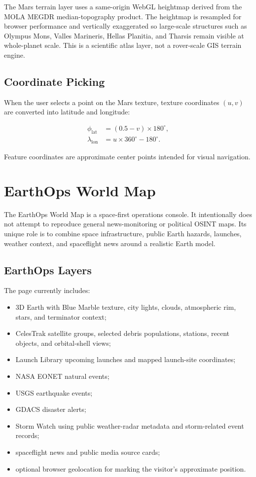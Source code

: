 \documentclass[11pt,a4paper]{article}
\begin{document}
The Mars terrain layer uses a same-origin WebGL heightmap derived from the MOLA MEGDR median-topography product. The heightmap is resampled for browser performance and vertically exaggerated so large-scale structures such as Olympus Mons, Valles Marineris, Hellas Planitia, and Tharsis remain visible at whole-planet scale. This is a scientific atlas layer, not a rover-scale GIS terrain engine.

\subsection{Coordinate Picking}

When the user selects a point on the Mars texture, texture coordinates $(u,v)$ are converted into latitude and longitude:

\begin{align}
\phi_{\mathrm{lat}} &= (0.5-v)\times 180^\circ,\\
\lambda_{\mathrm{lon}} &= u\times 360^\circ - 180^\circ.
\end{align}

Feature coordinates are approximate center points intended for visual navigation.

\section{EarthOps World Map}

The EarthOps World Map is a space-first operations console. It intentionally does not attempt to reproduce general news-monitoring or political OSINT maps. Its unique role is to combine space infrastructure, public Earth hazards, launches, weather context, and spaceflight news around a realistic Earth model.

\subsection{EarthOps Layers}

The page currently includes:

\begin{itemize}[leftmargin=*]
  \item 3D Earth with Blue Marble texture, city lights, clouds, atmospheric rim, stars, and terminator context;
  \item CelesTrak satellite groups, selected debris populations, stations, recent objects, and orbital-shell views;
  \item Launch Library upcoming launches and mapped launch-site coordinates;
  \item NASA EONET natural events;
  \item USGS earthquake events;
  \item GDACS disaster alerts;
  \item Storm Watch using public weather-radar metadata and storm-related event records;
  \item spaceflight news and public media source cards;
  \item optional browser geolocation for marking the visitor's approximate position.
\end{itemize}
\end{document}
